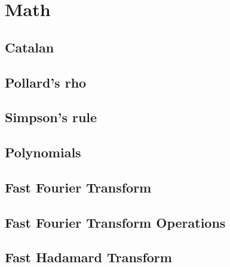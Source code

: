 

\section{Math}


\subsection{Catalan}

\subsection{Pollard's rho}

\subsection{Simpson's rule}

\subsection{Polynomials}

\subsection{Fast Fourier Transform}

\subsection{Fast Fourier Transform Operations}

\subsection{Fast Hadamard Transform}

